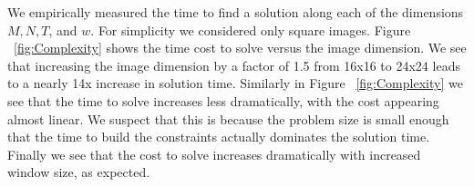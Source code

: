 We empirically measured the time to find a solution along each of the dimensions $M, N, T$, and $w$. For simplicity we considered only square images. Figure ~\ref{fig:Complexity} shows the time cost to solve versus the image dimension. We see that increasing the image dimension by a factor of 1.5 from 16x16 to 24x24 leads to a nearly 14x increase in solution time. Similarly in Figure ~\ref{fig:Complexity} we see that the time to solve increases less dramatically, with the cost appearing almost linear. We suspect that this is because the problem size is small enough that the time to build the constraints actually dominates the solution time. Finally we see that the cost to solve increases dramatically with increased window size, as expected.

%
%
%
